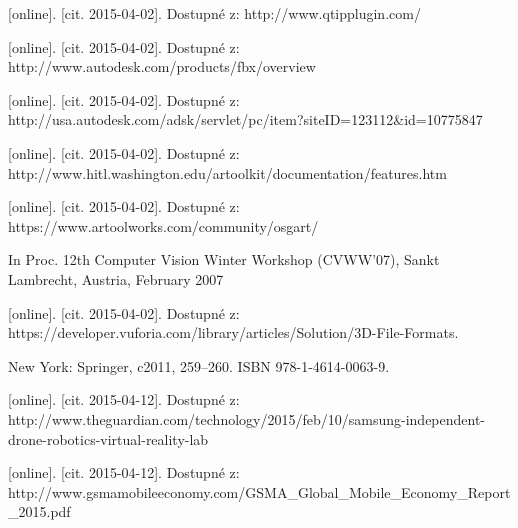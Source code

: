 \documentclass[twoside,12pt]{article}
\begin{document}
\begin{literatura}
{
	 [online]. [cit. 2015-04-02]. Dostupné z: http://www.qtipplugin.com/
}

{
	 [online]. [cit. 2015-04-02]. Dostupné z: http://www.autodesk.com/products/fbx/overview
}

{
	 [online]. [cit. 2015-04-02]. Dostupné z: http://usa.autodesk.com/adsk/servlet/pc/item?siteID=123112\&id=10775847
}

{
	 [online]. [cit. 2015-04-02]. Dostupné z: http://www.hitl.washington.edu/artoolkit/documentation/features.htm
}

{
	 [online]. [cit. 2015-04-02]. Dostupné z: https://www.artoolworks.com/community/osgart/
}

{
In Proc. 12th Computer Vision Winter Workshop (CVWW'07), Sankt Lambrecht, Austria, February 2007
}

{
	 [online]. [cit. 2015-04-02]. Dostupné z: https://developer.vuforia.com/library/articles/Solution/3D-File-Formats.
}

{
	 New York: Springer, c2011, 259–260. ISBN 978-1-4614-0063-9.
}
 

{
	[online]. [cit. 2015-04-12]. Dostupné z: http://www.theguardian.com/technology/2015/feb/10/samsung-independent-drone-robotics-virtual-reality-lab
}

{
	[online]. [cit. 2015-04-12]. Dostupné z: http://www.gsmamobileeconomy.com/GSMA\_Global\_Mobile\_Economy\_Report\_2015.pdf
}


\end{literatura}
\end{document}
